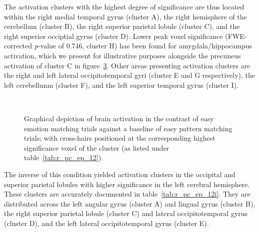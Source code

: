 		The activation clusters with the highest degree of significance are thus located within the right medial temporal gyrus (cluster A), the right hemisphere of the cerebellum (cluster B), the right superior parietal lobule (cluster C), and the right superior occiptial gyrus (cluster D).
		Lower peak voxel significance (FWE-corrected \textit{p}-value of 0.746, cluster H) has been found for amygdala/hippocampus activation, which we present for illustrative purposes alongside the precuneus activation of cluster C in figure~\ref{fig:r_pc_ep_12}.
		Other areas presenting activation clusters are the right and left lateral occipitotemporal gyri (cluster E and G respectively), the left cerebellunm (cluster F), and the left superior temporal gyrus (cluster I).
		\begin{figure}[H]
		    \begin{subfigure}[H]{0.495\textwidth}
			\centering{}
			\label{fig:r_pc_ep_12_pc}
		    \end{subfigure}
		    ~%
		    \begin{subfigure}[H]{0.495\textwidth}
			\centering{}
			\label{fig:r_pc_ep_12_am}
		    \end{subfigure}
		    \caption{Graphical depiction of brain activation in the contrast of easy emotion matching trials against a baseline of easy pattern matching trials; with cross-hairs positioned at the corresponding highest significance voxel of the cluster (as listed under table~\ref{tab:r_pc_ep_12}).}
		    \label{fig:r_pc_ep_12}
		\end{figure}
		
		The inverse of this condition yielded activation clusters in the occipital and superior parietal lobules with higher significance in the left cerebral hemisphere.
		These clusters are accurately documented in table~\ref{tab:r_pc_ep_12i}.
		They are distributed across the left angular gyrus (cluster A) and lingual gyrus (cluster B), the right superior parietal lobule (cluster C) and lateral occipitotemporal gyrus (cluster D), and the left lateral occipitotemporal gyrus (cluster E).
	    
